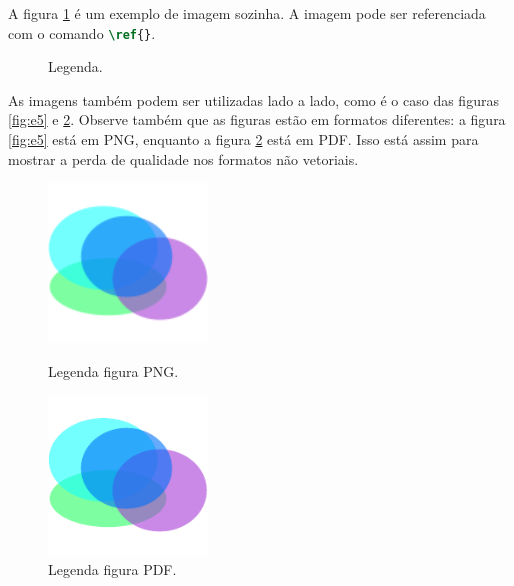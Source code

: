     A figura \ref{fig:e4} é um exemplo de imagem sozinha.
    A imagem pode ser referenciada com o comando \lstinline[language=TeX, style=Code]|\ref{}|.


    \begin{figure}[htb]
        \centering
        
        \caption{Legenda.}
        \label{fig:e4}
    \end{figure}

    As imagens também podem ser utilizadas lado a lado, como é o caso das figuras \ref{fig:e5} e \ref{fig:e6}.
    Observe também que as figuras estão em formatos diferentes: a figura \ref{fig:e5} está em PNG, enquanto a figura \ref{fig:e6} está em PDF.
    Isso está assim para mostrar a perda de qualidade nos formatos não vetoriais.


    \begin{figure}[htb]
        \centering
        \begin{minipage}{7.5cm}
            \centering
            \includegraphics[width=120pt]{images/figure.png}
            \caption{Legenda figura PNG.}
            \label{fig:e5}
        \end{minipage}
        \hfill
        \begin{minipage}{7.5cm}
            \centering
            \includegraphics[width=120pt]{images/figure.pdf}
            \caption{Legenda figura PDF.}
            \label{fig:e6}
        \end{minipage}
    \end{figure}

